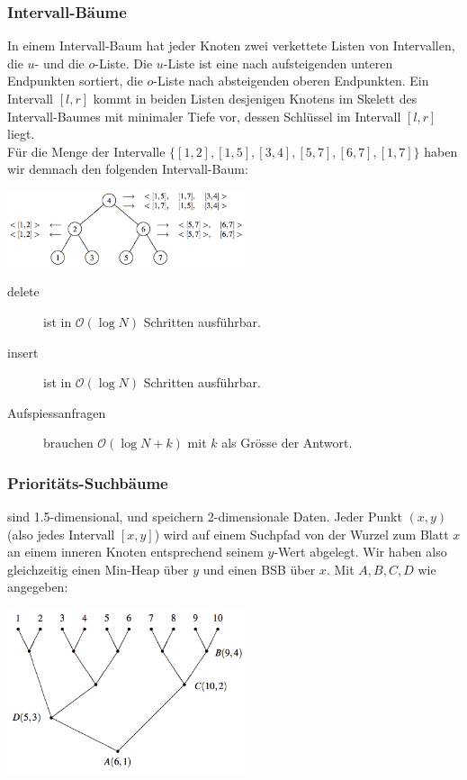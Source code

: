 \documentclass[a4paper, 9pt, DIV=20]{scrartcl}
\newcommand{\Oh}{\mathcal{O}}
\begin{document}
\subsubsection{Intervall-Bäume}
In einem Intervall-Baum hat jeder Knoten zwei verkettete Listen von Intervallen, die $u$- und die $o$-Liste. Die $u$-Liste ist eine nach aufsteigenden unteren Endpunkten sortiert, die $o$-Liste nach absteigenden oberen Endpunkten. Ein Intervall $[l, r]$ kommt in beiden Listen  desjenigen Knotens im Skelett des Intervall-Baumes mit minimaler Tiefe vor, dessen Schlüssel im Intervall $[l,r]$ liegt. \\
Für die Menge der Intervalle $\{[1,2],[1,5],[3,4],[5,7],[6,7],[1,7]\}$ haben wir demnach den folgenden Intervall-Baum:

\begin{center}
\includegraphics[width=7cm]{IntervallBaum}
\end{center}

\begin{description}
\item[delete] ist in $\Oh(\log{N})$ Schritten ausführbar.
\item[insert] ist in $\Oh(\log{N})$ Schritten ausführbar.
\item[Aufspiessanfragen] brauchen $\Oh(\log{N}+k)$ mit $k$ als Grösse der Antwort.	
\end{description}

\subsubsection{Prioritäts-Suchbäume}
sind 1.5-dimensional, und speichern 2-dimensionale Daten. Jeder Punkt $(x,y)$ (also jedes Intervall $[x,y]$) wird auf einem Suchpfad von der Wurzel zum Blatt $x$ an einem inneren Knoten entsprechend seinem $y$-Wert abgelegt. Wir haben also gleichzeitig einen Min-Heap über $y$ und einen BSB über $x$. Mit $A,B,C,D$ wie angegeben:

\begin{center}
\includegraphics[width=7cm]{PrioritaetsSuchBaum}
\end{center}
\end{document}
